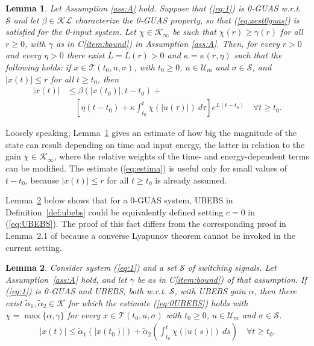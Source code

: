 \documentclass[9pt,final,journal]{IEEEtran}
\newtheorem{lema}{Lemma}
\def\K{\mathcal{K}}
\def\Ki{\K_{\infty}}
\def\KL{\mathcal{KL}}
\def\S{\mathcal{S}}
\def\T{\mathcal{T}}
\def\U{\mathcal{U}}
\begin{document}
%
%
\begin{lema}
  \label{lem:0GAS} 
  Let Assumption \ref{ass:A} hold. Suppose that (\ref{eq:1}) is 0-GUAS w.r.t. $\S$ and let $\beta \in \KL$ characterize the 0-GUAS property, so that (\ref{eq:xest0guas}) is satisfied for the 0-input system. Let $\chi\in \Ki$ be such that $\chi(r)\ge \gamma(r)$ for all $r\ge 0$, with $\gamma$ as in C\ref{item:bound}) in Assumption \ref{ass:A}.
%
  Then, for every $r>0$ and every $\eta>0$ there exist $L=L(r) > 0$ and $\kappa = \kappa(r,\eta)$ such that the following holds:
if $x \in \T(t_0,u,\sigma)$, with $t_0\ge 0$, $u\in \U_m$ and $\sigma\in \S$, and $|x(t)|\le r$ for all $t\ge t_0$, then 
\begin{align}
|x(t)|&\le  \beta(|x(t_0)|,t-t_0)+ \nonumber \\
 &\quad \left [\eta (t-t_0)+\kappa \int_{t_0}^{t}\chi(|u(\tau)|)\:d\tau\right ]e^{L(t-t_0)}\quad\forall t\ge t_0.
\label{eq:estima}
 \end{align}
\end{lema}
Loosely speaking, Lemma~\ref{lem:0GAS} gives an estimate of how big the magnitude of the state can result depending on time and input energy, the latter in relation to the gain $\chi\in\Ki$, where the relative weights of the time- and energy-dependent terms can be modified. The estimate (\ref{eq:estima}) is useful only for small values of $t-t_0$, because $|x(t)| \le r$ for all $t\ge t_0$ is already assumed. 

Lemma~\ref{lem:0UBEBS} below shows that for a 0-GUAS system, UBEBS in Definition~\ref{def:ubebs} could be equivalently defined setting $c= 0$ in (\ref{eq:UBEBS}). The proof of this fact differs from the corresponding proof in Lemma~2.1 of \cite{angson_dc00} because a converse Lyapunov theorem cannot be invoked in the current setting.
%
\begin{lema}
  \label{lem:0UBEBS} 
  Consider system (\ref{eq:1}) and a set $\S$ of switching signals. Let Assumption~\ref{ass:A} hold, and let $\gamma$ be as in C\ref{item:bound}) of that assumption. If (\ref{eq:1}) is 0-GUAS and UBEBS, both w.r.t. $\S$, with UBEBS gain $\alpha$, then there exist $\tilde\alpha_1, \tilde\alpha_2\in \K$  for which the estimate (\ref{eq:0UBEBS}) holds with $\chi=\max\{\alpha,\gamma\}$ for every $x \in \T(t_0,u,\sigma)$ with $t_0\ge 0$, $u\in \U_m$ and $\sigma\in \S$.
 \begin{align} 
 \label{eq:0UBEBS}
  |x(t)|\le \tilde \alpha_1(|x(t_0)|)+\tilde \alpha_2\left (\int_{t_0}^t\chi(|u(s)|)\:ds\right )\quad \forall t\ge t_0.
 \end{align}
\end{lema}
 
\end{document}
